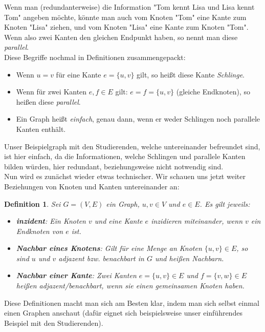 \documentclass{article}
\newtheorem{definition}{Definition}
\begin{document}
\bigskip
Wenn man (redundanterweise) die Information "Tom kennt Lisa und Lisa kennt Tom" angeben möchte, könnte man auch vom Knoten "Tom" eine Kante zum Knoten "Lisa" ziehen, und vom Knoten "Lisa" eine Kante zum Knoten "Tom". Wenn also zwei Kanten den gleichen Endpunkt haben, so nennt man diese \textit{parallel}.\\
\bigskip
Diese Begriffe nochmal in Definitionen zusammengepackt:\\
\begin{itemize}
	\item Wenn \(u = v\) für eine Kante \(e = \{u, v\}\) gilt, so heißt diese Kante \textit{Schlinge}.
	\item Wenn für zwei Kanten \(e, f \in E\) gilt: \(e = f = \{u, v\}\) (gleiche Endknoten), so heißen diese \textit{parallel}. 
	\item Ein Graph heißt \textit{einfach}, genau dann, wenn er weder Schlingen noch parallele Kanten enthält.
\end{itemize}
Unser Beispielgraph mit den Studierenden, welche untereinander befreundet sind, ist hier einfach, da die Informationen, welche Schlingen und parallele Kanten bilden würden, hier redundant, beziehungsweise nicht notwendig sind.\\

\newpage
Nun wird es zunächst wieder etwas technischer. Wir schauen uns jetzt weiter Beziehungen von Knoten und Kanten untereinander an:\\
\begin{definition}
    Sei \(G = (V, E)\) ein Graph, \(u, v \in V\) und \(e \in E\).
    Es gilt jeweils:
    \begin{itemize}
        \item \textbf{\textit{inzident}}:
            Ein Knoten \(v\) und eine Kante \(e\) \textit{inzidieren} miteinander, wenn \(v\) ein \textit{Endknoten} von \(e\) ist.
        \item \textbf{\textit{Nachbar eines Knotens}}:
            Gilt für eine Menge an Knoten \(\{u, v\} \in E\), so sind \(u\) und \(v\) \textit{adjazent} bzw. \textit{benachbart} in \(G\) und heißen \textit{Nachbarn}.
        \item \textbf{\textit{Nachbar einer Kante}}:
            Zwei Kanten \(e = \{u, v\} \in E\) und \(f = \{v, w\} \in E\) heißen \textit{adjazent/benachbart}, wenn sie einen gemeinsamen Knoten haben.
    \end{itemize}
\end{definition}
\bigskip
Diese Definitionen macht man sich am Besten klar, indem man sich selbst einmal einen Graphen anschaut (dafür eignet sich beispielsweise unser einführendes Beispiel mit den Studierenden).\\
\end{document}
